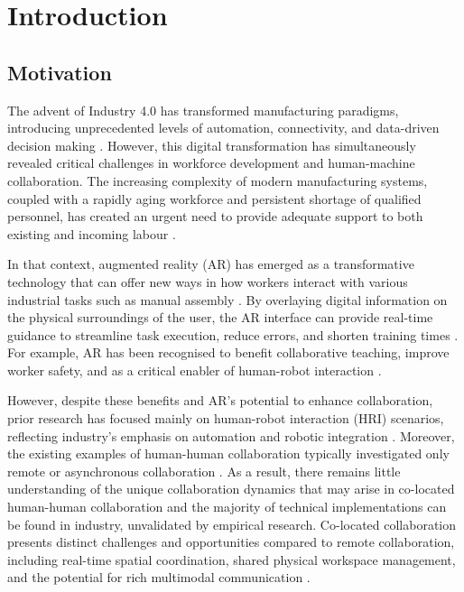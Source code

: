 \chapter{Introduction}\label{chapter:introduction }
\section{Motivation}
The advent of Industry 4.0 has transformed manufacturing paradigms, introducing unprecedented levels of automation, connectivity, and data-driven decision making \cite{moencks2022augmented}. However, this digital transformation has simultaneously revealed critical challenges in workforce development and human-machine collaboration. The increasing complexity of modern manufacturing systems, coupled with a rapidly aging workforce and persistent shortage of qualified personnel, has created an urgent need to provide adequate support to both existing and incoming labour \cite{moencks2022augmented, deSouza2020surveyIndustrialAR} \cite{ozkan2022analysing}. 


In that context, augmented reality (AR) has emerged as a transformative technology that can offer new ways in how workers interact with various industrial tasks such as manual assembly \cite{doerner2022xrTextbook}. By overlaying digital information on the physical surroundings of the user, the AR interface can provide real-time guidance to streamline task execution, reduce errors, and shorten training times \cite{wang2016arAssemblyLitRev}.
For example, AR has been recognised to benefit collaborative teaching, improve worker safety, and as a critical enabler of human-robot interaction \cite{Agati2020Augmented}.

However, despite these benefits and AR's potential to enhance collaboration, prior research has focused mainly on human-robot interaction (HRI) scenarios, reflecting industry's emphasis on automation and robotic integration \cite{Lukosch2015Collaboration}. Moreover, the existing examples of human-human collaboration typically investigated only remote or asynchronous collaboration \cite{rubart2022augmenting}. As a result, there remains little understanding of the unique collaboration dynamics that may arise in co-located human-human collaboration and the majority of technical implementations can be found in industry, unvalidated by empirical research. Co-located collaboration presents distinct challenges and opportunities compared to remote collaboration, including real-time spatial coordination, shared physical workspace management, and the potential for rich multimodal communication \cite{Lukosch2015Collaboration}.

